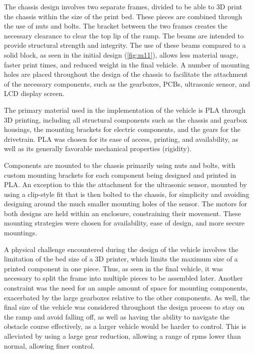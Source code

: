 \documentclass[11pt]{article}
\begin{document}
The chassis design involves two separate frames, divided to be able to 3D print the chassis within the size of the print bed. These pieces are combined through the use of nuts and bolts. The bracket between the two frames creates the necessary clearance to clear the top lip of the ramp. The beams are intended to provide structural strength and integrity. The use of these beams compared to a solid block, as seen in the initial design (\autoref{fig:m11}), allows less material usage, faster print times, and reduced weight in the final vehicle. A number of mounting holes are placed throughout the design of the chassis to facilitate the attachment of the necessary components, such as the gearboxes, PCBs, ultrasonic sensor, and LCD display screen.

The primary material used in the implementation of the vehicle is PLA through 3D printing, including all structural components such as the chassis and gearbox housings, the mounting brackets for electric components, and the gears for the drivetrain. PLA was chosen for its ease of access, printing, and availability, as well as its generally favorable mechanical properties (rigidity).

Components are mounted to the chassis primarily using nuts and bolts, with custom mounting brackets for each component being designed and printed in PLA. An exception to this the attachment for the ultrasonic sensor, mounted by using a clip-style fit that is then bolted to the chassis, for simplicity and avoiding designing around the much smaller mounting holes of the sensor. The motors for both designs are held within an enclosure, constraining their movement. These mounting strategies were chosen for availability, ease of design, and more secure mountings.

A physical challenge encountered during the design of the vehicle involves the limitation of the bed size of a 3D printer, which limits the maximum size of a printed component in one piece. Thus, as seen in the final vehicle, it was necessary to split the frame into multiple pieces to be assembled later. Another constraint was the need for an ample amount of space for mounting components, exacerbated by the large gearboxes relative to the other components. As well, the final size of the vehicle was considered throughout the design process to stay on the ramp and avoid falling off, as well as having the ability to navigate the obstacle course effectively, as a larger vehicle would be harder to control. This is alleviated by using a large gear reduction, allowing a range of rpms lower than normal, allowing finer control.
\end{document}
